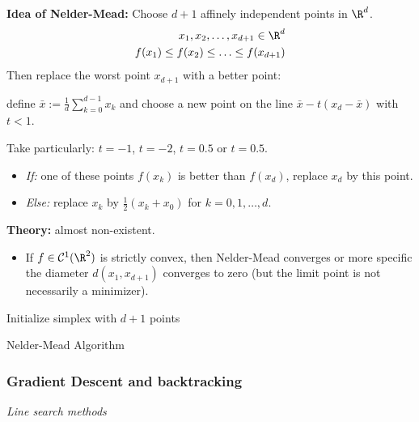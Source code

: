 \textbf{Idea of Nelder-Mead:}
Choose  \(d+1\) affinely independent points in  \(\R^d\).
\begin{align*}
	x_1, x_2, \ldots, x_{d+1} \in \R^d \\
	f(x_1) \leq f(x_2) \leq \ldots \leq f(x_{d+1})
\end{align*}
Then replace the worst point  \(x_{d+1}\) with a better point:

define  \(\bar{x} := \frac{1}{d} \sum_{k=0}^{d-1} x_k\) and choose a new point on the line  \(\bar{x} - t(x_{d} - \bar{x})\) with  \(t < 1\).

Take particularly:  \(t= -1\),  \(t = -2\),  \(t = 0.5\) or  \(t = 0.5\).

\begin{itemize}
	\item \textit{If:} one of these points  \(f(x_k)\) is better than  \(f(x_{d})\), replace  \(x_{d}\) by this point.
	\item \textit{Else:} replace  \(x_k\) by  \(\frac{1}{2}(x_k + x_0)\) for  \(k = 0, 1, \ldots, d\).
\end{itemize}

\textbf{Theory:} almost non-existent.
\begin{itemize}
	\item If  \(f \in \mathcal{C}^1(\R^2)\) is strictly convex, then Nelder-Mead converges or more specific the diameter  \(d(x_1, x_{d+1})\) converges to zero (but the limit point is not necessarily a minimizer).
\end{itemize}

\begin{algorithm}[H]
	\SetAlgoLined
	Initialize simplex with  \(d+1\) points\;
	\;
	\caption{Nelder-Mead Algorithm}
\end{algorithm}

\subsubsection*{Gradient Descent and backtracking}
\vspace{-0.1cm}
\textit{Line search methods}

